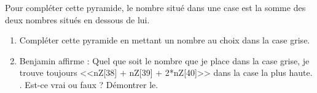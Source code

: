 \begin{minipage}{0.4\linewidth}
	\begin{center}
\end{center}
\end{minipage}
\begin{minipage}{0.6\linewidth}
Pour compléter cette pyramide, le nombre situé dans une case est la somme des deux nombres situés en dessous de lui.

\begin{enumerate}
	\item Compléter cette pyramide en mettant un nombre au choix dans la case grise.
	\item Benjamin affirme : \og{} Quel que soit le nombre que je place dans la case grise, je trouve toujours <<nZ[38] + nZ[39] + 2*nZ[40]>> dans la case la plus haute. \fg{}. Est-ce vrai ou faux ? Démontrer le.
\end{enumerate}
\end{minipage}


